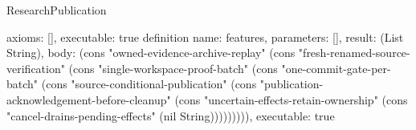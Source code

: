 \begin{lexlean}{ResearchPublication}
\begin{semanticmodule}
{ axioms: [],
 executable: true
}
definition{
 name: features,
 parameters: [],
 result: (List String),
 body: (cons "owned-evidence-archive-replay" (cons "fresh-renamed-source-verification" (cons "single-workspace-proof-batch" (cons "one-commit-gate-per-batch" (cons "source-conditional-publication" (cons "publication-acknowledgement-before-cleanup" (cons "uncertain-effects-retain-ownership" (cons "cancel-drains-pending-effects" (nil String))))))))),
 executable: true
}
\end{semanticmodule}
\end{lexlean}
